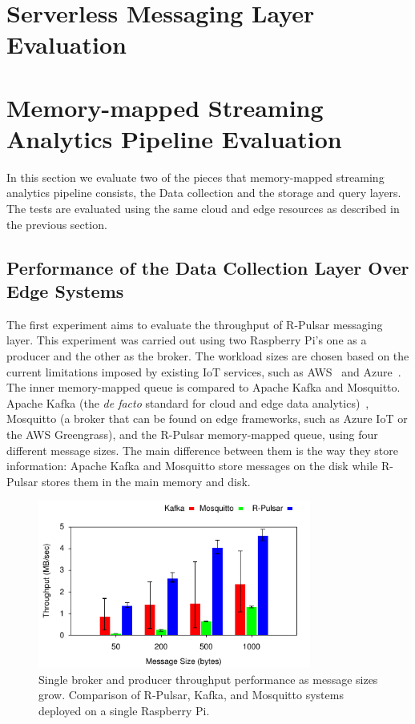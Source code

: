 \section{Serverless Messaging Layer Evaluation}

\section{Memory-mapped Streaming Analytics Pipeline Evaluation}

In this section we evaluate two of the pieces that memory-mapped streaming analytics pipeline consists, the Data collection and the storage and query layers. The tests are evaluated using the same cloud and edge resources as described in the previous section.

\subsection{Performance of the Data Collection Layer Over Edge Systems}

The first experiment aims to evaluate the throughput of R-Pulsar messaging layer. This experiment was carried out using two Raspberry Pi's one as a producer and the other as the broker. The workload sizes are chosen based on the current limitations imposed by existing IoT services, such as AWS~\cite{AWS-MQTT} and Azure~\cite{AZURE-MQTT}. The inner memory-mapped queue is compared to Apache Kafka and Mosquitto. Apache Kafka (the \textit{de facto} standard for cloud and edge data analytics)~\cite{Young2017, firework, planner}, Mosquitto (a broker that can be found on edge frameworks, such as Azure IoT or the AWS Greengrass), and the R-Pulsar memory-mapped queue, using four different message sizes.  The main difference between them is the way they store information: Apache Kafka and Mosquitto store messages on the disk while R-Pulsar stores them in the main memory and disk. 

\begin{figure}[h]
  \centering
  \includegraphics[width=0.8\textwidth]{Results/ProducerBar}
    \caption{Single broker and producer throughput performance as message sizes grow. Comparison of R-Pulsar, Kafka, and Mosquitto systems deployed on a single Raspberry Pi.}
  \label{fig:ProducerBar}
\end{figure}

